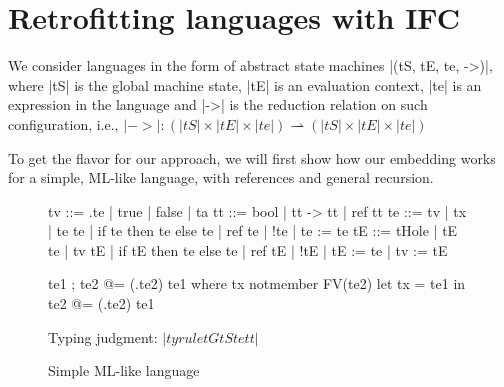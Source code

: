 \section{Retrofitting languages with IFC}
\label{sec:retrofit}


We consider languages in the form of abstract state machines |(tS, tE,
te, ->)|, where |tS| is the global machine state, |tE| is an evaluation
context, |te| is an expression in the language and |->| is the
reduction relation on such configuration, i.e., $|->| : (|tS| \times
|tE| \times |te|) \rightharpoonup (|tS| \times |tE| \times |te|)$ 


To get the flavor for our approach, we will first show how our embedding
works for a simple, ML-like language, with references and general recursion.

\begin{figure}
\begin{code}
tv   ::= \tx.te | true | false | ta
tt   ::= bool | tt -> tt | ref tt
te   ::= tv | tx | te te | if te then te else te | ref te | !te | te := te
tE   ::= tHole | tE te | tv tE | if tE then te else te
       | ref tE | !tE | tE := te | tv := tE 

te1 ; te2            @= (\tx.te2) te1  where  tx notmember FV(te2)
let tx = te1 in te2  @= (\tx.te2) te1
\end{code}

Typing judgment: $|tyrule tG tS te tt|$


\caption{Simple ML-like language}
\label{fig:ml}
\end{figure}

